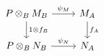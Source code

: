 \documentclass[12pt]{standalone}
\begin{document}
        $$

\begin{tikzcd}
 P \otimes_B M_B \ar[d,"1 \otimes f_B"] \ar[r,"\psi_M"] & M_A \ar[d,"f_A"] \\
 P \otimes_B N_B \ar[r,"\psi_N"] & N_A 
\end{tikzcd}
        $$
        
\end{document}
